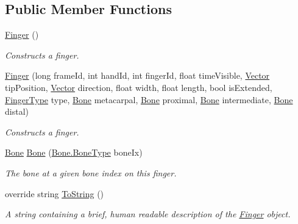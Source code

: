\subsection*{Public Member Functions}
\begin{DoxyCompactItemize}
\item 
\mbox{\hyperlink{class_leap_1_1_finger_a8f4b7394c11cf9d7db50f0d7d1e3324d}{Finger}} ()
\begin{DoxyCompactList}\small\item\em Constructs a finger. \end{DoxyCompactList}\item 
\mbox{\hyperlink{class_leap_1_1_finger_aa8b049ce7229fdeb1de58a59c2d9298d}{Finger}} (long frame\+Id, int hand\+Id, int finger\+Id, float time\+Visible, \mbox{\hyperlink{struct_leap_1_1_vector}{Vector}} tip\+Position, \mbox{\hyperlink{struct_leap_1_1_vector}{Vector}} direction, float width, float length, bool is\+Extended, \mbox{\hyperlink{class_leap_1_1_finger_ae75e8d46a01aff0bd5c6d6fb99e2f2ba}{Finger\+Type}} type, \mbox{\hyperlink{class_leap_1_1_bone}{Bone}} metacarpal, \mbox{\hyperlink{class_leap_1_1_bone}{Bone}} proximal, \mbox{\hyperlink{class_leap_1_1_bone}{Bone}} intermediate, \mbox{\hyperlink{class_leap_1_1_bone}{Bone}} distal)
\begin{DoxyCompactList}\small\item\em Constructs a finger. \end{DoxyCompactList}\item 
\mbox{\hyperlink{class_leap_1_1_bone}{Bone}} \mbox{\hyperlink{class_leap_1_1_finger_a5ae2d74471ca480d76820478067bda64}{Bone}} (\mbox{\hyperlink{class_leap_1_1_bone_a21054e31cefa7b75f25a026006fdbb1b}{Bone.\+Bone\+Type}} bone\+Ix)
\begin{DoxyCompactList}\small\item\em The bone at a given bone index on this finger. \end{DoxyCompactList}\item 
override string \mbox{\hyperlink{class_leap_1_1_finger_a35cbefd8df3c7bc8a1f0d45a45105fa0}{To\+String}} ()
\begin{DoxyCompactList}\small\item\em A string containing a brief, human readable description of the \mbox{\hyperlink{class_leap_1_1_finger}{Finger}} object. \end{DoxyCompactList}\end{DoxyCompactItemize}

